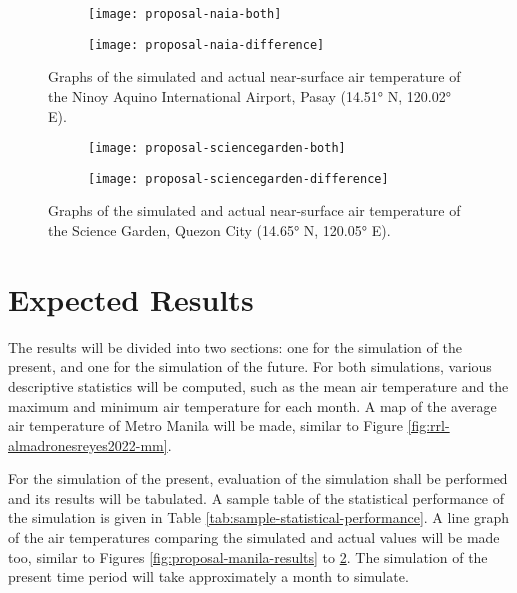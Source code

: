 	\begin{figure}
		\centering
		\begin{subfigure}{\textwidth}
			\texttt{[image: proposal-naia-both]}
		\end{subfigure}
		\begin{subfigure}{\textwidth}
			\texttt{[image: proposal-naia-difference]}
		\end{subfigure}
		\caption{
			Graphs of the simulated and actual near-surface air temperature of the Ninoy Aquino International Airport, Pasay (\ang{14.51} N, \ang{120.02} E).
		}
		\label{fig:proposal-naia-results}
	\end{figure}

	\begin{figure}
		\centering
		\begin{subfigure}{\textwidth}
			\texttt{[image: proposal-sciencegarden-both]}
		\end{subfigure}
		\begin{subfigure}{\textwidth}
			\texttt{[image: proposal-sciencegarden-difference]}
		\end{subfigure}
		\caption{
			Graphs of the simulated and actual near-surface air temperature of the Science Garden, Quezon City (\ang{14.65} N, \ang{120.05} E).
		}
		\label{fig:proposal-sciencegarden-results}
	\end{figure}

\section{Expected Results}
	The results will be divided into two sections:
		one for the simulation of the present,
		and one for the simulation of the future.
	For both simulations,
	various descriptive statistics will be computed, such as the mean air temperature and the maximum and minimum air temperature for each month.
	A map of the average air temperature of Metro Manila will be made, similar to Figure \ref{fig:rrl-almadronesreyes2022-mm}.
	
	For the simulation of the present,
	evaluation of the simulation shall be performed and its results will be tabulated.
	A sample table of the statistical performance of the simulation is given in Table \ref{tab:sample-statistical-performance}.
	A line graph of the air temperatures comparing the simulated and actual values will be made too, similar to Figures \ref{fig:proposal-manila-results} to \ref{fig:proposal-sciencegarden-results}.
	The simulation of the present time period will take approximately a month to simulate.

